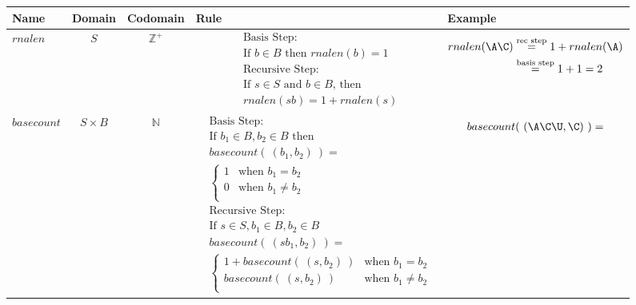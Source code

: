 \begin{center}
\begin{tabular}{p{0.65in}ccp{2.4in}p{2.4in}}
{\scriptsize {\bf Name}} & {\scriptsize {\bf  Domain}} & {\scriptsize {\bf Codomain}} & {\scriptsize {\bf Rule}} &{\scriptsize {\bf Example}}\\
\hline 
$rnalen$ & $S$ & $\mathbb{Z}^+$ & 
    {\begin{align*}    
    &\textrm{Basis Step:} \\
    &\textrm{If } b \in B\textrm{ then } \textit{rnalen}(b) = 1 \\
    &\textrm{Recursive Step:}\\
    &\textrm{If } s \in S\textrm{ and } b \in B\textrm{, then  }\\
    &\textit{rnalen}(sb) = 1 + \textit{rnalen}(s)
    \end{align*}} & 
    {\begin{align*}
        rnalen(\A\C) &\overset{\text{rec step}}{=} 1 +rnalen(\A) \\ 
        &\overset{\text{basis step}}{=} 1 + 1 = 2
    \end{align*}}\\
\hline
$basecount$ & $S \times B$ & $\mathbb{N}$ & 
{\begin{align*}    
    &\textrm{Basis Step:} \\
    &\textrm{If } b_1 \in B, b_2 \in B \textrm{ then} \\
    &basecount(~(b_1, b_2)~) = \\
    &\begin{cases}
        1 & \textrm{when } b_1 = b_2 \\
        0 & \textrm{when } b_1 \neq b_2 \\
    \end{cases}\\
    &\textrm{Recursive Step:}\\
    &\textrm{If } s \in S, b_1 \in B, b_2 \in B\\
    &basecount(~(sb_1, b_2)~) = \\
    &\begin{cases}
        1 + \textit{basecount}(~(s, b_2)~) & \textrm{when } b_1 = b_2 \\
        \textit{basecount}(~(s, b_2)~) & \textrm{when } b_1 \neq b_2 \\
    \end{cases}
    \end{align*}} & 
    {\begin{align*}
        basecount(~(\A\C\U, \C)~) = 

\end{align*}}
\end{tabular}
\end{center}
